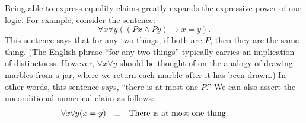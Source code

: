 


Being able to express equality claims greatly expands the expressive
power of our logic.  For example, consider the sentence:
\[ \forall x\forall y((Px\wedge Py)\to x=y) . \] This sentence says
that for any two things, if both are $P$, then they are the same
thing.  (The English phrase ``for any two things'' typically carries
an implication of distinctness.  However, $\forall x\forall y$ should
be thought of on the analogy of drawing marbles from a jar, where we
return each marble after it has been drawn.)  In other words, this
sentence says, ``there is at most one $P$.''  We can also assert the
unconditional numerical claim as follows:
\[ \begin{array}{l c p{5cm}}
     \forall x\forall y(x=y) & \equiv & There is at most one
                               thing. \end{array} \]

